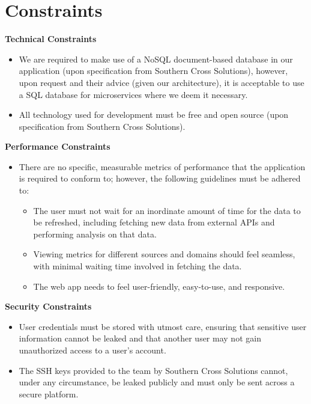 \documentclass[12pt]{article}
\begin{document}
\newpage

\section{Constraints}

\textbf{Technical Constraints}
\begin{itemize}
  \item We are required to make use of a NoSQL document-based database in our application (upon specification from Southern Cross Solutions), however, upon request and their advice (given our architecture), it is acceptable to use a SQL database for microservices where we deem it necessary.
  \item All technology used for development must be free and open source (upon specification from Southern Cross Solutions).
\end{itemize}

\textbf{Performance Constraints}
\begin{itemize}
  \item There are no specific, measurable metrics of performance that the application is required to conform to; however, the following guidelines must be adhered to:
    \begin{itemize}
      \item The user must not wait for an inordinate amount of time for the data to be refreshed, including fetching new data from external APIs and performing analysis on that data.
      \item Viewing metrics for different sources and domains should feel seamless, with minimal waiting time involved in fetching the data.
      \item The web app needs to feel user-friendly, easy-to-use, and responsive.
    \end{itemize}
\end{itemize}

\textbf{Security Constraints}
\begin{itemize}
  \item User credentials must be stored with utmost care, ensuring that sensitive user information cannot be leaked and that another user may not gain unauthorized access to a user's account.
  \item The SSH keys provided to the team by Southern Cross Solutions cannot, under any circumstance, be leaked publicly and must only be sent across a secure platform.
\end{itemize}
\end{document}
